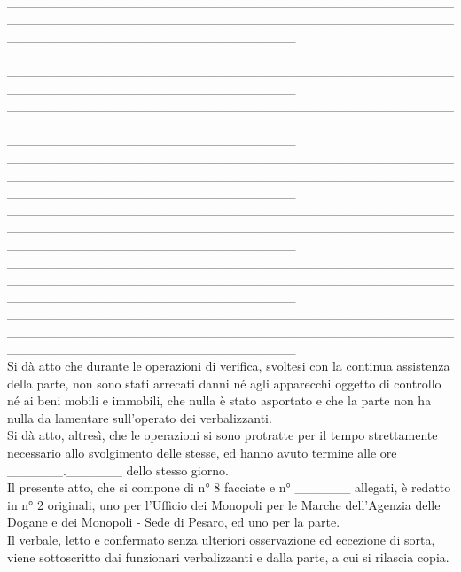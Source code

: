 \documentclass[12pt]{article}
\begin{document}
\\\_\_\_\_\_\_\_\_\_\_\_\_\_\_\_\_\_\_\_\_\_\_\_\_\_\_\_\_\_\_\_\_\_\_\_\_\_\_\_\_\_\_\_\_\_\_\_\_\_\_\_\_\_\_\_\_\_\_\_\_\_\_\_\_\_\_\_\_\_\_\_\_\_\_\_\_\_\_\_\_\_\_\_\_\_\_\_\_\_\_\_\_\_\_\_\_\_\_\_\_\_\_\_\_\_\_\_\_\_\_\_\_\_\_\_\_\_\_\_\_\_\_\_\_\_\_\_
\\\_\_\_\_\_\_\_\_\_\_\_\_\_\_\_\_\_\_\_\_\_\_\_\_\_\_\_\_\_\_\_\_\_\_\_\_\_\_\_\_\_\_\_\_\_\_\_\_\_\_\_\_\_\_\_\_\_\_\_\_\_\_\_\_\_\_\_\_\_\_\_\_\_\_\_\_\_\_\_\_\_\_\_\_\_\_\_\_\_\_\_\_\_\_\_\_\_\_\_\_\_\_\_\_\_\_\_\_\_\_\_\_\_\_\_\_\_\_\_\_\_\_\_\_\_\_\_
\\\_\_\_\_\_\_\_\_\_\_\_\_\_\_\_\_\_\_\_\_\_\_\_\_\_\_\_\_\_\_\_\_\_\_\_\_\_\_\_\_\_\_\_\_\_\_\_\_\_\_\_\_\_\_\_\_\_\_\_\_\_\_\_\_\_\_\_\_\_\_\_\_\_\_\_\_\_\_\_\_\_\_\_\_\_\_\_\_\_\_\_\_\_\_\_\_\_\_\_\_\_\_\_\_\_\_\_\_\_\_\_\_\_\_\_\_\_\_\_\_\_\_\_\_\_\_\_
\\\_\_\_\_\_\_\_\_\_\_\_\_\_\_\_\_\_\_\_\_\_\_\_\_\_\_\_\_\_\_\_\_\_\_\_\_\_\_\_\_\_\_\_\_\_\_\_\_\_\_\_\_\_\_\_\_\_\_\_\_\_\_\_\_\_\_\_\_\_\_\_\_\_\_\_\_\_\_\_\_\_\_\_\_\_\_\_\_\_\_\_\_\_\_\_\_\_\_\_\_\_\_\_\_\_\_\_\_\_\_\_\_\_\_\_\_\_\_\_\_\_\_\_\_\_\_\_
\\\_\_\_\_\_\_\_\_\_\_\_\_\_\_\_\_\_\_\_\_\_\_\_\_\_\_\_\_\_\_\_\_\_\_\_\_\_\_\_\_\_\_\_\_\_\_\_\_\_\_\_\_\_\_\_\_\_\_\_\_\_\_\_\_\_\_\_\_\_\_\_\_\_\_\_\_\_\_\_\_\_\_\_\_\_\_\_\_\_\_\_\_\_\_\_\_\_\_\_\_\_\_\_\_\_\_\_\_\_\_\_\_\_\_\_\_\_\_\_\_\_\_\_\_\_\_\_
\\\_\_\_\_\_\_\_\_\_\_\_\_\_\_\_\_\_\_\_\_\_\_\_\_\_\_\_\_\_\_\_\_\_\_\_\_\_\_\_\_\_\_\_\_\_\_\_\_\_\_\_\_\_\_\_\_\_\_\_\_\_\_\_\_\_\_\_\_\_\_\_\_\_\_\_\_\_\_\_\_\_\_\_\_\_\_\_\_\_\_\_\_\_\_\_\_\_\_\_\_\_\_\_\_\_\_\_\_\_\_\_\_\_\_\_\_\_\_\_\_\_\_\_\_\_\_\_
\\\_\_\_\_\_\_\_\_\_\_\_\_\_\_\_\_\_\_\_\_\_\_\_\_\_\_\_\_\_\_\_\_\_\_\_\_\_\_\_\_\_\_\_\_\_\_\_\_\_\_\_\_\_\_\_\_\_\_\_\_\_\_\_\_\_\_\_\_\_\_\_\_\_\_\_\_\_\_\_\_\_\_\_\_\_\_\_\_\_\_\_\_\_\_\_\_\_\_\_\_\_\_\_\_\_\_\_\_\_\_\_\_\_\_\_\_\_\_\_\_\_\_\_\_\_\_\_\\

Si dà atto che durante le operazioni di verifica, svoltesi con la continua assistenza della parte, non sono stati arrecati danni né agli apparecchi oggetto di controllo né ai beni mobili e immobili, che nulla è stato asportato e che la parte non ha nulla da lamentare sull’operato dei verbalizzanti.\\
Si dà atto, altresì, che le operazioni si sono protratte per il tempo strettamente necessario allo svolgimento delle stesse, ed hanno avuto termine alle ore \_\_\_\_\_\_.\_\_\_\_\_\_ dello stesso giorno.\\
Il presente atto, che si compone di n° 8 facciate e n° \_\_\_\_\_\_ allegati, è redatto in n° 2 originali, uno per l’Ufficio dei Monopoli per le Marche dell’Agenzia delle Dogane e dei Monopoli - Sede di Pesaro, ed uno per la parte.\\
Il verbale, letto e confermato senza ulteriori osservazione ed eccezione di sorta, viene sottoscritto dai funzionari verbalizzanti e dalla parte, a cui si rilascia copia.
\end{document}
